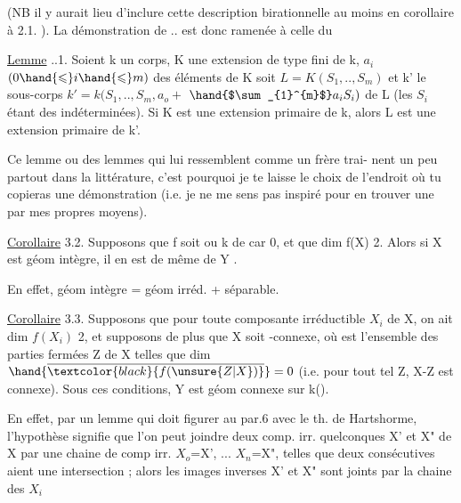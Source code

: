 
(NB il y aurait lieu d'inclure cette description birationnelle au moins
en corollaire à 2.1. ). La démonstration de .. est donc ramenée à
celle du

\uline{Lemme} ..1.  Soient k un corps, K une extension de type fini de k, 
$a_i$ $(0\hand{\leqslant} i\hand{\leqslant} m)$ des éléments de K  
 soit $L = K(S_1,..,S_m)$ et k' le sous-corps $k'= k(S_1,..,S_m,a_o +$
$\hand{$\sum_{1}^{m}$}a_iS_i)$ de L (les $S_i$ étant des indéterminées). \hand{,} Si K est une
extension primaire de k, alors L est une extension primaire de k'.

\margin{$|$} Ce lemme\hand{,} ou des lemmes qui lui ressemblent comme un frère\hand{,} trai-%
nent un peu partout dans la littérature, c'est pourquoi je te laisse le
choix de l'endroit où tu copieras une démonstration (i.e. je ne me sens
pas inspiré pour en trouver une par mes propres moyens).

\uline{Corollaire} 3.2. Supposons que f soit   ou k de car 0,
et que dim f(X)\over{$\hand{>}$}{$\geqslant$} 2. Alors si X est géom intègre, il en est de même de
Y\hand{$_\eta$} .

En effet, géom intègre = géom irréd. + séparable.

\uline{Corollaire} 3.3. Supposons  que pour toute composante irréductible $X_i$
de X, on ait dim $f(X_i)$\over{$\hand{>}$}{$\geqslant$} 2, et supposons de plus que X soit -connexe,
où  est l'ensemble des parties fermées Z de X telles que dim $\hand{\overline{\textcolor{black}{f(\unsure{Z|X})}}}=0$
(i.e. pour tout tel Z, X-Z est connexe). Sous ces conditions, Y\hand{$_\eta$} est
géom connexe sur k(\hand{$\eta$}).

En effet, par un lemme qui doit figurer au par.6 avec le th. de
Hartshorme, l'hypothèse signifie que l'on peut joindre deux comp. irr.
quelconques X' et X" de X par une chaine de comp irr. $X_o$=X', ...
$X_n$=X", telles que deux consécutives aient une intersection ; alors
les images inverses X'\hand{$_\eta$} et X"\hand{$_\eta$} sont joints par la chaine des $X_{i}$\hand{$_\eta$} 

